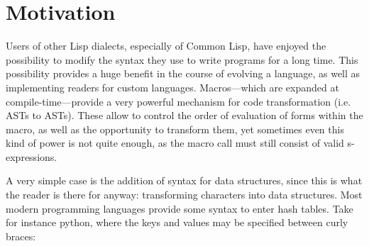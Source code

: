 \documentclass[a4paper,10pt,twoside]{report}
\newcommand{\el}{Emacs Lisp}
\newcommand{\cl}{Common Lisp}
\newcommand{\sym}[1]{\texttt{#1}}
\begin{document}



\section{Motivation}
\label{section:motivation}
Users of other Lisp dialects, especially of \cl{}, have enjoyed the possibility
to modify the syntax they use to write programs for a long time.  This
possibility provides a huge benefit in the course of evolving a language, as
well as implementing readers for custom languages.  Macros---which are expanded
at compile-time---provide a very powerful mechanism for code transformation
(i.e. ASTs to ASTs).  These allow to control the order of evaluation of forms
within the macro, as well as the opportunity to transform them, yet sometimes
even this kind of power is not quite enough, as the macro call must still
consist of valid s-expressions.

A very simple case is the addition of syntax for data structures, since this is
what the reader is there for anyway: transforming characters into data
structures.  Most modern programming languages provide some syntax to enter hash
tables.  Take for instance python, where the keys and values may be specified
between curly braces:
\end{document}
